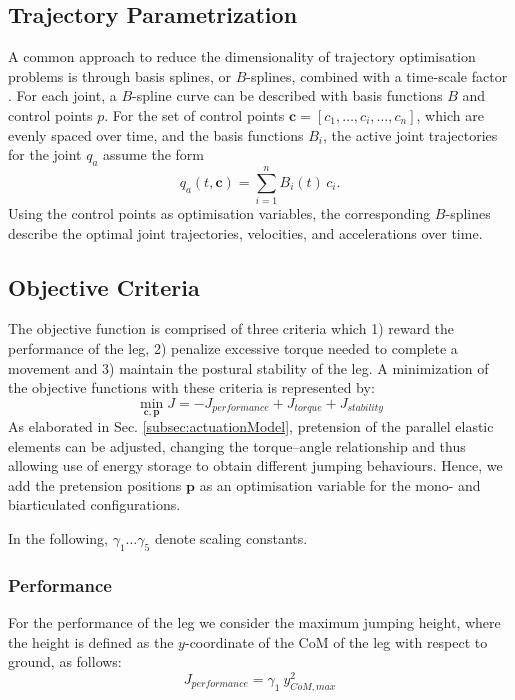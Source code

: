 \documentclass[letterpaper, 10 pt, conference]{ieeeconf}  %
\begin{document}
\subsection{Trajectory Parametrization} 
\label{subsec:trajectoryParametrization}
A common approach to reduce the dimensionality of trajectory optimisation problems is through basis splines, or $B$-splines, combined with a time-scale factor \cite{ude2000planning,babivc2009biarticulated,wang1999weight,albro2001optimal}. For each joint, a $B$-spline curve can be described with basis functions $B$ and control points $p$. For the set of control points $\mathbf{c}=\left[c_1,\dots,c_i,\dots,c_n\right]$, which are evenly spaced over time, and the basis functions $B_i$, the active joint trajectories for the joint $q_a$ assume the form
\begin{equation}
	q_a(t,\mathbf{c}) = \sum_{i=1}^{n} B_i (t) \, c_i.
\end{equation}
Using the control points as optimisation variables, the corresponding $B$-splines describe the optimal joint trajectories, velocities, and accelerations over time.

\subsection{Objective Criteria} 
\label{subsec:objectiveCriteria}
The objective function is comprised of three criteria which 1) reward the performance of the leg, 2) penalize excessive torque needed to complete a movement and 3) maintain the postural stability of the leg. A minimization of the objective functions with these criteria is represented by:
\begin{equation}
	\min_{\mathbf{c}, \mathbf{p}} J = -J_{performance} + J_{torque} + J_{stability}
\end{equation}
As elaborated in Sec. \ref{subsec:actuationModel}, pretension of the parallel elastic elements can be adjusted, changing the torque--angle relationship and thus allowing use of energy storage to obtain different jumping behaviours. Hence, we add the pretension positions $\mathbf{p}$ as an optimisation variable for the mono- and biarticulated configurations.

In the following, $\gamma_1 \dots \gamma_5$ denote scaling constants.

\subsubsection{Performance}
For the performance of the leg we consider the maximum jumping height, where the height is defined as the $y$-coordinate of the CoM of the leg with respect to ground, as follows:
\begin{equation}
	J_{performance} = \gamma_1 \: y_{CoM,max}^2
\end{equation}
\end{document}
